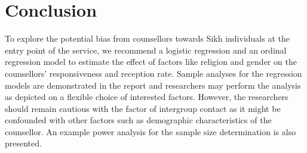 \documentclass[11pt]{article}
\begin{document}
\section{Conclusion}
To explore the potential bias from counsellors towards Sikh individuals at the entry point of the service, we recommend a logistic regression and an ordinal regression model to estimate the effect of factors like religion and gender on the counsellors' responsiveness and reception rate. Sample analyses for the regression models are demonstrated in the report and researchers may perform the analysis as depicted on a flexible choice of interested factors. However, the researchers should remain cautious with the factor of intergroup contact as it might be confounded with other factors such as demographic characteristics of the counsellor. An example power analysis for the sample size determination is also presented. 

\clearpage
\appendix
{}
\end{document}
